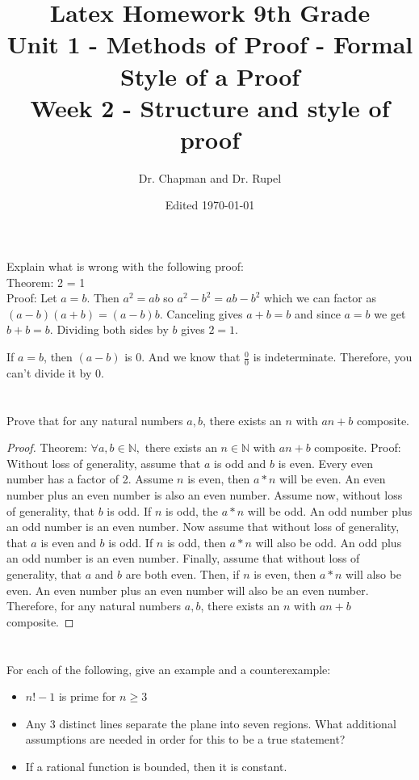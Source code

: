 \documentclass{amsart}
\title{Latex Homework 9th Grade\\ Unit 1 - Methods of Proof - Formal Style of a Proof\\ Week 2 - Structure and style of proof}
\author{Dr. Chapman and Dr. Rupel}
\date{Edited \today}
\begin{document}
\maketitle

\section{}
    Explain what is wrong with the following proof:\\ Theorem: 2 = 1\\Proof: Let \(a = b\). Then \(a^2 = ab\) so \(a^2-b^2 = ab - b^2\) which we can factor as \((a-b)(a+b) = (a-b)b\). Canceling gives \(a+b = b\) and since \(a = b\) we get \(b+b = b\). Dividing both sides by \(b\) gives \(2 = 1\).

	If \( a = b\), then \((a-b)\) is 0. And we know that $\frac{0}{0}$ is indeterminate. Therefore, you can't divide it by 0.
\section{}
    Prove that for any natural numbers \(a,b\), there exists an \(n\) with \(an+b\) composite.
	\begin{proof}
	Theorem: $\forall a,b\in\mathbb{N},$ there exists an $n\in\mathbb{N}$ with $an+b$ composite.
	Proof: Without loss of generality, assume that $a$ is odd and $b$ is even. Every even number has a factor of 2. Assume \(n\) is even, then $a*n$ will be even. An even number plus an
	even number is also an even number. Assume now, without loss of generality, that $b$ is odd. If $n$ is odd, the $a*n$ will be odd. An odd number plus an odd number is an even number. Now assume that without loss of generality, that $a$ is even and $b$ is odd. If $n$ is odd, then $a*n$ will also be odd. An odd plus an odd number is an even number. Finally, assume that without loss of generality, that $a$ and $b$ are both even. Then, if $n$ is even, then $a*n$ will also be even. An even number plus an even number will also be an even number. Therefore, for any natural numbers $a,b$, there exists an $n$ with $an+b$ composite. 
	\end{proof}
    
\section{}
    For each of the following, give an example and a counterexample:
    \begin{itemize}
        \item \(n!-1\) is prime for \(n \geq 3\)
        \item Any 3 distinct lines separate the plane into seven regions.  What additional assumptions are needed in order for this to be a true statement?
        \item If a rational function is bounded, then it is constant.
    \end{itemize}
\end{document}
